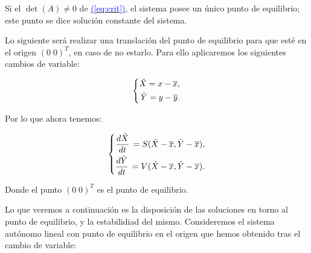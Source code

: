 \documentclass[12pt,a4paper]{report} %
\newcommand{\eref}[1]{\hyperref[#1]{\textcolor{blue}{(\ref*{#1})}}}
\newcommand{\eref}[1]{\hyperref[#1]{\textcolor{blue}{\textit{(\ref*{#1})}}}}
\begin{document}
	\noindent Si el $\det(A)\neq0$ de \eref{eq:crit}, el sistema posee un único punto de equilibrio; este punto se dice solución constante del sistema.
    

    
    \vspace{0.5cm}\noindent Lo siguiente será realizar una translación del punto de equilibrio para que esté en el origen $(0\; 0)^T$, en caso de no estarlo. Para ello aplicaremos los siguientes cambios de variable:
    
	\begin{equation}
		\label{eq:trans}
		\scalebox{1}{$\displaystyle
			\left\{
			\begin{aligned}
				\tilde{X}=x-\overline{x}, \\
				\tilde{Y}=y-\overline{y}.
			\end{aligned}
			\right.
			$}
	\end{equation}\smallskip
	
\noindent Por lo que ahora tenemos:
	
	\begin{equation}
		\label{eq:trans2}
		\scalebox{1}{$\displaystyle
			\left\{
			\begin{aligned}
				\frac{d\tilde{X}}{dt}\,=S(\tilde{X}-\overline{x},\tilde{Y}-\overline{x}), \\
				\frac{d\tilde{Y}}{dt}\,=V(\tilde{X}-\overline{x},\tilde{Y}-\overline{x}).
			\end{aligned}
			\right.
			$}
	\end{equation}\smallskip
	
	Donde el punto  $(0\; 0)^T$ es el punto de equilibrio.
	
	\vspace{0.5cm}Lo que veremos a continuación es la disposición de las soluciones en torno al punto de equilibrio, y la estabilidiad del mismo. Consideremos el sistema autónomo lineal con punto de equilibrio en el origen que hemos obtenido tras el cambio de variable:
	
\end{document}
